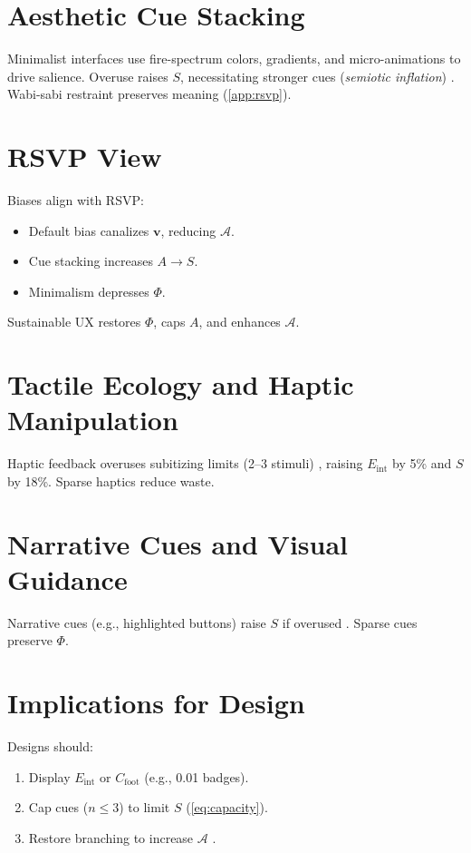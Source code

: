 \documentclass[openany]{book}
\newcommand{\PhiS}{\Phi} %
\newcommand{\vvec}{\mathbf{v}} %
\newcommand{\Sent}{S} %
\newcommand{\Eint}{E_{\mathrm{int}}} %
\newcommand{\Cfoot}{C_{\mathrm{foot}}} %
\newcommand{\Auton}{\mathcal{A}} %
\newcommand{\kWh}{\mathrm{kWh}}
\begin{document}
\section{Aesthetic Cue Stacking}
\label{sec:aesthetic}
Minimalist interfaces use fire-spectrum colors, gradients, and micro-animations to drive salience. Overuse raises \(\Sent\), necessitating stronger cues (\emph{semiotic inflation}) \citep{colak2024}. Wabi-sabi restraint preserves meaning (\cref{app:rsvp}).

\section{RSVP View}
\label{sec:illusion-rsvp}
Biases align with RSVP:
\begin{itemize}
  \item Default bias canalizes \(\vvec\), reducing \(\Auton\).
  \item Cue stacking increases \(A \to \Sent\).
  \item Minimalism depresses \(\PhiS\).
\end{itemize}
Sustainable UX restores \(\PhiS\), caps \(A\), and enhances \(\Auton\).

\section{Tactile Ecology and Haptic Manipulation}
\label{sec:tactile}
Haptic feedback overuses subitizing limits (2--3 stimuli) \citep{gallace2006}, raising \(\Eint\) by 5\% and \(\Sent\) by 18\%. Sparse haptics reduce waste.

\section{Narrative Cues and Visual Guidance}
\label{sec:narrative}
Narrative cues (e.g., highlighted buttons) raise \(\Sent\) if overused \citep{lewis1942}. Sparse cues preserve \(\PhiS\).

\section{Implications for Design}
\label{sec:illusion-implications}
Designs should:
\begin{enumerate}
  \item Display \(\Eint\) or \(\Cfoot\) (e.g., \SI{0.01}{\kWh} badges).
  \item Cap cues (\(n \leq 3\)) to limit \(\Sent\) (\cref{eq:capacity}).
  \item Restore branching to increase \(\Auton\) \citep{doctorow2022}.
\end{enumerate}
\end{document}
